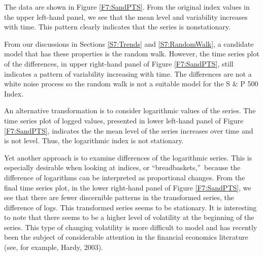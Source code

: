 The data are shown in Figure \ref{F7:SandPTS}. From the original
index values in the upper left-hand panel, we see that the mean
level and variability increases with time. This pattern clearly
indicates that the series is nonstationary.

From our discussions in Sections \ref{S7:Trends} and
\ref{S7:RandomWalk}, a candidate model that has these properties is
the random walk. However, the time series plot of the differences,
in upper right-hand panel of Figure \ref{F7:SandPTS}, still
indicates a pattern of variability increasing with time. The
differences are not a white noise process so the random walk is not
a suitable model for the S \& P 500 Index.

An alternative transformation is to consider logarithmic values of
the series. The time series plot of logged values, presented in
lower left-hand panel of Figure \ref{F7:SandPTS}, indicates the the
mean level of the series increases over time and is not level. Thus,
the logarithmic index is not stationary.

Yet another approach is to examine differences of the logarithmic
series. This is especially desirable when looking at indices, or
\textquotedblleft breadbaskets,\textquotedblright\ because the
difference of logarithms can be interpreted as proportional changes.
From the final time series plot, in the lower right-hand panel of
Figure \ref{F7:SandPTS}, we see that there are fewer discernible
patterns in the transformed series, the difference of logs. This
transformed series seems to be stationary. It is interesting to note
that there seems to be a higher level of volatility at the beginning
of the series. This type of changing volatility is more difficult to
model and has recently been the subject of considerable attention in
the financial economics literature (see, for example, Hardy, 2003).


